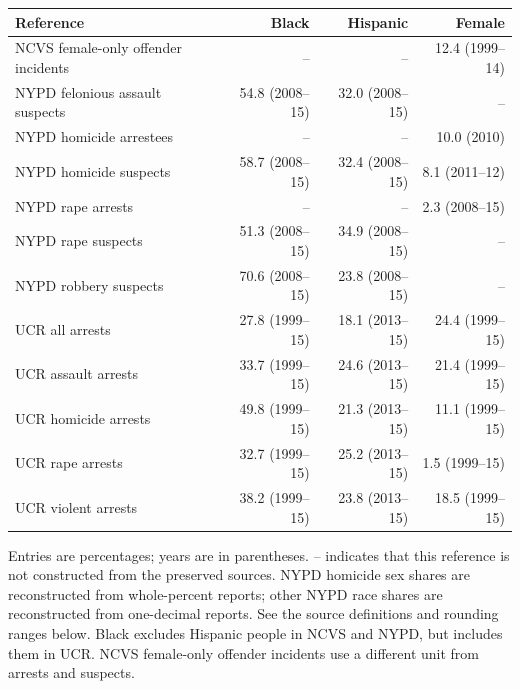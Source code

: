 \begin{center}
\label{tab:criminal_references}
\small\setlength{\tabcolsep}{4pt}\renewcommand{\arraystretch}{1.25}
\begin{tabular}{@{}>{\raggedright\arraybackslash}p{.38\linewidth}rrr@{}}
\toprule Reference & Black & Hispanic & Female \\
\midrule
NCVS female-only offender incidents & -- & -- & 12.4 {\scriptsize (1999--14)} \\
NYPD felonious assault suspects & 54.8 {\scriptsize (2008--15)} & 32.0 {\scriptsize (2008--15)} & -- \\
NYPD homicide arrestees & -- & -- & 10.0 {\scriptsize (2010)} \\
NYPD homicide suspects & 58.7 {\scriptsize (2008--15)} & 32.4 {\scriptsize (2008--15)} & 8.1 {\scriptsize (2011--12)} \\
NYPD rape arrests & -- & -- & 2.3 {\scriptsize (2008--15)} \\
NYPD rape suspects & 51.3 {\scriptsize (2008--15)} & 34.9 {\scriptsize (2008--15)} & -- \\
NYPD robbery suspects & 70.6 {\scriptsize (2008--15)} & 23.8 {\scriptsize (2008--15)} & -- \\
UCR all arrests & 27.8 {\scriptsize (1999--15)} & 18.1 {\scriptsize (2013--15)} & 24.4 {\scriptsize (1999--15)} \\
UCR assault arrests & 33.7 {\scriptsize (1999--15)} & 24.6 {\scriptsize (2013--15)} & 21.4 {\scriptsize (1999--15)} \\
UCR homicide arrests & 49.8 {\scriptsize (1999--15)} & 21.3 {\scriptsize (2013--15)} & 11.1 {\scriptsize (1999--15)} \\
UCR rape arrests & 32.7 {\scriptsize (1999--15)} & 25.2 {\scriptsize (2013--15)} & 1.5 {\scriptsize (1999--15)} \\
UCR violent arrests & 38.2 {\scriptsize (1999--15)} & 23.8 {\scriptsize (2013--15)} & 18.5 {\scriptsize (1999--15)} \\
\bottomrule\end{tabular}
\par\smallskip
\parbox{\linewidth}{\footnotesize\raggedright Entries are percentages; years are in parentheses.
-- indicates that this reference is not constructed from the preserved sources.
NYPD homicide sex shares are reconstructed from whole-percent reports; other NYPD race shares
are reconstructed from one-decimal reports. See the source definitions and rounding ranges below.
Black excludes Hispanic people in NCVS and NYPD, but includes them in UCR.
NCVS female-only offender incidents use a different unit from arrests and suspects.}
\end{center}
